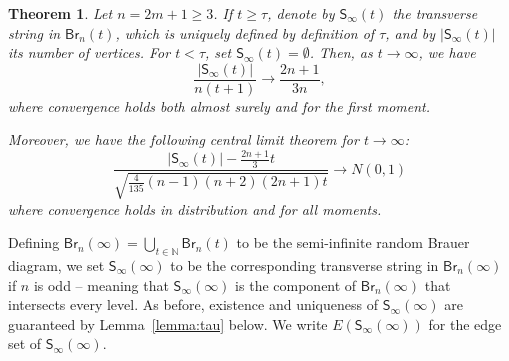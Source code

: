\documentclass[a4paper,11pt,reqno]{amsart}
\newcommand{\paul}[1]{\todo[color=yellow!70,inline]{Paul: #1}}
\newcommand{\fabian}[1]{\todo[color=red!50,inline]{Fabian: #1}}
\newcommand{\IN}{\mathbb{N}}
\newcommand{\Br}{\mathsf{Br}}
\newcommand{\Soo}{\mathsf{S}_\infty}
\newtheorem{theorem}[lemma]{Theorem}
\theoremstyle{definition}
\begin{document}
\begin{theorem}\label{theorem:Soo}
 Let $n=2m+1\geq 3$. If $t\geq\tau$, denote by $\Soo(t)$ the transverse string in $\Br_n(t)$, which is uniquely defined by definition of $\tau$, and by $|\Soo(t)|$ its number of vertices. For $t<\tau$, set $\Soo(t)=\emptyset$. 
 Then, as $t\to\infty$, we have 
 \begin{equation}\label{eq:SooLLN}
  \frac{|\Soo(t)|}{n(t+1)} \to \frac{2n+1}{3n},
 \end{equation}
 where convergence holds both almost surely and for the first moment. 

 Moreover, we have the following central limit theorem for $t\to\infty$:
 \begin{equation}\label{eq:SooCLT}
  \frac{|\Soo(t)|-\frac{2n+1}{3}t}{\sqrt{\frac{4}{135}(n-1)(n+2)(2n+1)t}} \to N(0,1)
 \end{equation}
 where convergence holds in distribution and for all moments. 
\end{theorem}

Defining $\Br_n(\infty)=\bigcup_{t\in\IN} \Br_n(t)$ to be the semi-infinite random Brauer diagram, we set $\Soo(\infty)$ to be the corresponding transverse string in $\Br_n(\infty)$ if $n$ is odd -- meaning that $\Soo(\infty)$ is the component of $\Br_n(\infty)$ that intersects every level. As before, existence and uniqueness of $\Soo(\infty)$ are guaranteed by Lemma~\ref{lemma:tau} below. We write $E(\Soo(\infty))$ for the edge set of $\Soo(\infty)$.  

\end{document}
